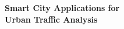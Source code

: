 \documentclass[b5paper,12pt]{report}
\theoremstyle{definition}
\begin{document}
\begin{singlespace}

\thispagestyle{empty}

\begin{center}
{\LARGE\bf Smart City Applications for \\Urban Traffic Analysis}
\vspace*{6cm}

\end{center}

\tableofcontents

\listoffigures

\listoftables

\end{singlespace}

\newpage
\end{document}
